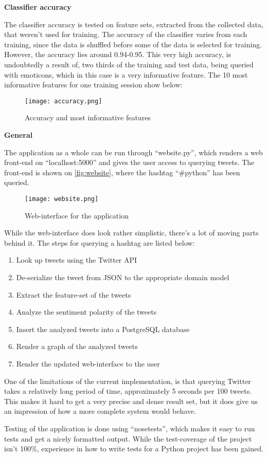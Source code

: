 \documentclass[Main]{subfiles}
\begin{document}
\textbf{Classifier accuracy}

The classifier accuracy is tested on feature sets, extracted from the collected data, that weren't used for training. The accuracy of the classifier varies from each training, since the data is shuffled before some of the data is selected for training. However, the accuracy lies around 0.94-0.95. This very high accuracy, is undoubtedly a result of, two thirds of the training and test data, being queried with emoticons, which in this case is a very informative feature. The 10 most informative features for one training session show below:

\begin{figure}[h]
  \centering
  \texttt{[image: accuracy.png]}
  \caption{Accuracy and most informative features}
  \label{fig:accuracy}
\end{figure}


\textbf{General}

The application as a whole can be run through ``website.py'', 
which renders a web front-end on ``localhost:5000'' and gives the user access to querying tweets.
The front-end is shown on \autoref{fig:website}, where the hashtag ``\#python'' has been queried.

\begin{figure}[h]
  \centering
  \texttt{[image: website.png]}
  \caption{Web-interface for the application}
  \label{fig:website}
\end{figure}

While the web-interface does look rather simplistic, there's a lot of moving parts behind it.
The steps for querying a hashtag are listed below:
\begin{enumerate}
\item Look up tweets using the Twitter API
\item De-serialize the tweet from JSON to the appropriate domain model
\item Extract the feature-set of the tweets
\item Analyze the sentiment polarity of the tweets
\item Insert the analyzed tweets into a PostgreSQL database
\item Render a graph of the analyzed tweets
\item Render the updated web-interface to the user
\end{enumerate}

One of the limitations of the current implementation, is that querying Twitter takes a relatively long period of time,
approximately 5 seconds per 100 tweets.
This makes it hard to get a very precise and dense result set, but it does give us an impression of how a more complete system would behave.

Testing of the application is done using ``nosetests'', which makes it easy to run tests and get a nicely formatted output.
While the test-coverage of the project isn't 100\%, experience in how to write tests for a Python project has been gained.
\end{document}
